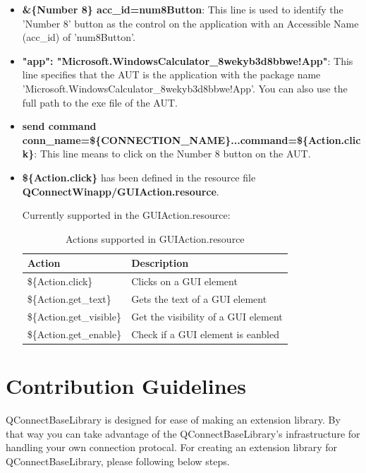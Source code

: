 \begin{itemize}
\item \colorbox{gray!16}{\textbf{\&\{Number 8\} acc\_id=num8Button}}: This line is used to identify the 'Number 8' button as the control on the application with an Accessible Name (acc\_id) of 'num8Button'.
\item \colorbox{gray!16}{\textbf{"app": "Microsoft.WindowsCalculator\_8wekyb3d8bbwe!App"}}: This line specifies that the AUT is the application with the package name 'Microsoft.WindowsCalculator\_8wekyb3d8bbwe!App'. You can also use the full path to the exe file of the AUT.
\item \colorbox{gray!16}{\textbf{send command conn\_name=\$\{CONNECTION\_NAME\}...command=\$\{Action.click\}}}: This line means to click on the Number 8 button on the AUT.
\item \colorbox{gray!16}{\textbf{\$\{Action.click\}}} has been defined in the resource file \colorbox{gray!16}{\textbf{QConnectWinapp/GUIAction.resource}}.

Currently supported in the GUIAction.resource:
\begin{table}[h]
    \centering
    \begin{tabular}{|l|l|}
        \hline
        \textbf{Action} & \textbf{Description} \\ \hline
        \$\{Action.click\} & Clicks on a GUI element \\ \hline
        \$\{Action.get\_text\} & Gets the text of a GUI element \\ \hline
        \$\{Action.get\_visible\} & Get the visibility of a GUI element \\ \hline
        \$\{Action.get\_enable\} & Check if a GUI element is eanbled \\ \hline
    \end{tabular}
    \caption{Actions supported in GUIAction.resource}
    \label{tab:actions}
\end{table}


\end{itemize}


\hypertarget{contribution-guidelines}{%
\section{Contribution Guidelines}\label{contribution-guidelines}}

QConnectBaseLibrary is designed for ease of making an extension library.
By that way you can take advantage of the QConnectBaseLibrary's
infrastructure for handling your own connection protocal. For creating
an extension library for QConnectBaseLibrary, please following below
steps.


